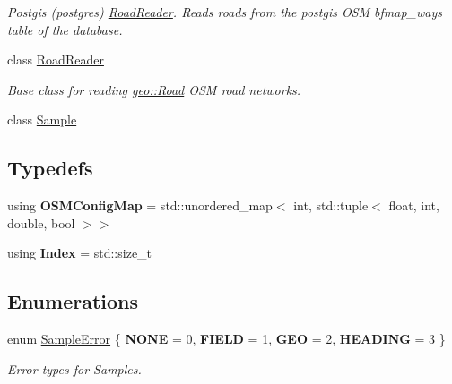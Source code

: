 \begin{DoxyCompactItemize}
\begin{DoxyCompactList}\small\item\em Postgis (postgres) \hyperlink{classgeo__data_1_1RoadReader}{Road\+Reader}. Reads roads from the postgis O\+SM bfmap\+\_\+ways table of the database. \end{DoxyCompactList}\item 
class \hyperlink{classgeo__data_1_1RoadReader}{Road\+Reader}
\begin{DoxyCompactList}\small\item\em Base class for reading \hyperlink{classgeo_1_1Road}{geo\+::\+Road} O\+SM road networks. \end{DoxyCompactList}\item 
class \hyperlink{classgeo__data_1_1Sample}{Sample}
\end{DoxyCompactItemize}
\subsection*{Typedefs}
\begin{DoxyCompactItemize}
\item 
using {\bfseries O\+S\+M\+Config\+Map} = std\+::unordered\+\_\+map$<$ int, std\+::tuple$<$ float, int, double, bool $>$$>$\hypertarget{namespacegeo__data_a7b3566f9a0ecf0ed14afebe84de56101}{}\label{namespacegeo__data_a7b3566f9a0ecf0ed14afebe84de56101}

\item 
using {\bfseries Index} = std\+::size\+\_\+t\hypertarget{namespacegeo__data_a143b1b20973c843f51d75e42151737f4}{}\label{namespacegeo__data_a143b1b20973c843f51d75e42151737f4}

\end{DoxyCompactItemize}
\subsection*{Enumerations}
\begin{DoxyCompactItemize}
\item 
enum \hyperlink{namespacegeo__data_a2374ba83ef1f8bcad5d82c67dc7c8ddd}{Sample\+Error} \{ {\bfseries N\+O\+NE} = 0, 
{\bfseries F\+I\+E\+LD} = 1, 
{\bfseries G\+EO} = 2, 
{\bfseries H\+E\+A\+D\+I\+NG} = 3
 \}\hypertarget{namespacegeo__data_a2374ba83ef1f8bcad5d82c67dc7c8ddd}{}\label{namespacegeo__data_a2374ba83ef1f8bcad5d82c67dc7c8ddd}
\begin{DoxyCompactList}\small\item\em Error types for Samples. \end{DoxyCompactList}
\end{DoxyCompactItemize}
